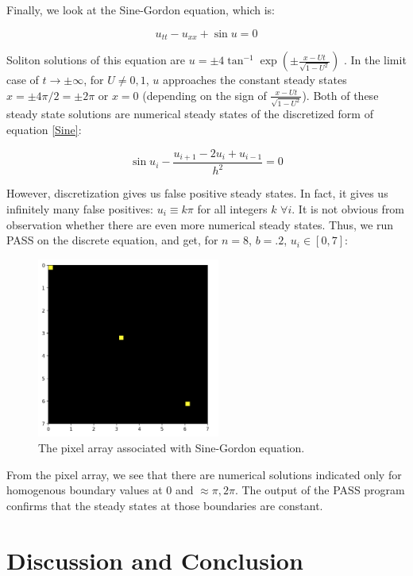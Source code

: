 \documentclass[11pt]{article}
\begin{document}
Finally, we look at the Sine-Gordon equation, which is:

\begin{equation}
    \label{Sine}
    u_{tt} - u_{xx} + \sin u = 0
\end{equation}

Soliton solutions of this equation are $u = \pm 4 \tan^{-1} \exp(\pm \frac{x - Ut}{\sqrt{1 - U^2}})$ \citep{SG-behavior}. In the limit case of $t \rightarrow \pm \infty$, for $U \neq 0,1$, $u$ approaches the constant steady states $x = \pm 4 \pi/2 = \pm 2\pi$ or $x = 0$ (depending on the sign of $\frac{x-Ut}{\sqrt{1-U^2}}$). Both of these steady state solutions are numerical steady states of the discretized form of equation \ref{Sine}:

\begin{equation}
    \label{discrete SG}
    \sin u_i - \frac{u_{i+1} - 2u_i + u_{i-1}}{h^2} = 0
\end{equation}

However, discretization gives us false positive steady states. In fact, it gives us infinitely many false positives: $u_i \equiv k\pi$ for all integers $k$ $\forall i$. It is not obvious from observation whether there are even more numerical steady states. Thus, we run PASS on the discrete equation, and get, for $n = 8$, $b = .2$, $u_i \in [0,7]$:

\begin{figure}[h]
\centering
\includegraphics[width=6cm]{images/SG.png}
\caption{The pixel array associated with Sine-Gordon equation.}
\label{sgPixel}
\end{figure}

From the pixel array, we see that there are numerical solutions indicated only for homogenous boundary values at 0 and $\approx \pi, 2\pi$. The output of the PASS program confirms that the steady states at those boundaries are constant.

\section{Discussion and Conclusion}
\end{document}
